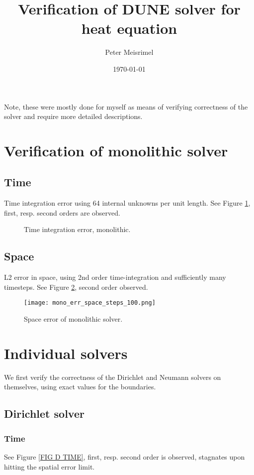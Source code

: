 \documentclass[a4paper,10pt]{article}
\title{Verification of DUNE solver for heat equation}
\author{Peter Meisrimel}
\date{\today}
\begin{document}
\maketitle
\tableofcontents
\newpage

Note, these were mostly done for myself as means of verifying correctness of the solver and require more detailed descriptions.
\section{Verification of monolithic solver}
\FloatBarrier
\subsection{Time}
Time integration error using 64 internal unknowns per unit length. See Figure \ref{FIG MONO TIME}, first, resp. second orders are observed.

\begin{figure}[ht!]
\label{FIG MONO TIME}
\caption{Time integration error, monolithic.}
\end{figure}
% 
\FloatBarrier
\subsection{Space}
L2 error in space, using 2nd order time-integration and sufficiently many timesteps. See Figure \ref{FIG MONO SPACE}, second order observed.

\begin{figure}[ht!]
\begin{center}
\texttt{[image: mono\_err\_space\_steps\_100.png]}
\label{FIG MONO SPACE}
\caption{Space error of monolithic solver.}
\end{center}
\end{figure}
% 
\FloatBarrier
\section{Individual solvers}
We first verify the correctness of the Dirichlet and Neumann solvers on themselves, using exact values for the boundaries.
% 
\FloatBarrier
\subsection{Dirichlet solver}
% 
\FloatBarrier
\subsubsection{Time}
See Figure \ref{FIG D TIME}, first, resp. second order is observed, stagnates upon hitting the spatial error limit.
\end{document}
